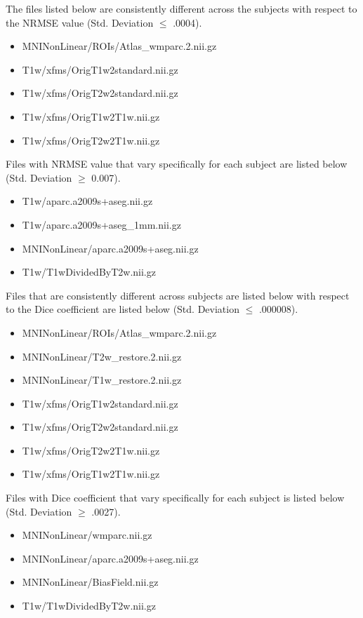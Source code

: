 The files listed below are consistently different across the subjects with respect to the NRMSE value (Std. Deviation $\leq$ .0004).
\begin{itemize}
  \item MNINonLinear/ROIs/Atlas\_wmparc.2.nii.gz
  \item T1w/xfms/OrigT1w2standard.nii.gz
  \item T1w/xfms/OrigT2w2standard.nii.gz
  \item T1w/xfms/OrigT1w2T1w.nii.gz
  \item T1w/xfms/OrigT2w2T1w.nii.gz
\end{itemize}

Files with NRMSE value that vary specifically for each subject are listed below (Std. Deviation $\geq$ 0.007).
\begin{itemize}
  \item T1w/aparc.a2009s+aseg.nii.gz
  \item T1w/aparc.a2009s+aseg\_1mm.nii.gz
  \item MNINonLinear/aparc.a2009s+aseg.nii.gz
  \item T1w/T1wDividedByT2w.nii.gz
\end{itemize}

Files that are consistently different across subjects are listed below with respect to the Dice coefficient are listed below (Std. Deviation $\leq$ .000008).
\begin{itemize}
  \item MNINonLinear/ROIs/Atlas\_wmparc.2.nii.gz
  \item MNINonLinear/T2w\_restore.2.nii.gz
  \item MNINonLinear/T1w\_restore.2.nii.gz
  \item T1w/xfms/OrigT1w2standard.nii.gz
  \item T1w/xfms/OrigT2w2standard.nii.gz
  \item T1w/xfms/OrigT2w2T1w.nii.gz
  \item T1w/xfms/OrigT1w2T1w.nii.gz
\end{itemize}

Files with Dice coefficient that vary specifically for each subject is listed below (Std. Deviation $\geq$ .0027).
\begin{itemize}
  \item MNINonLinear/wmparc.nii.gz
  \item MNINonLinear/aparc.a2009s+aseg.nii.gz
  \item MNINonLinear/BiasField.nii.gz
  \item T1w/T1wDividedByT2w.nii.gz
\end{itemize}
\hfill \break

